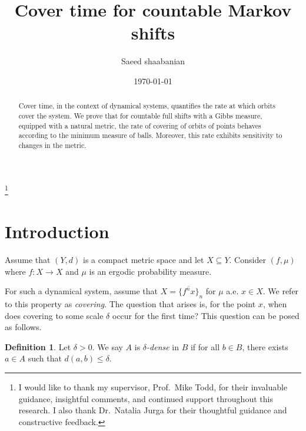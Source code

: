 \documentclass[11pt, reqno]{amsart}
\theoremstyle{plain}%
\theoremstyle{definition}
\newtheorem{definition}[theorem]{Definition}
\theoremstyle{definition}
\numberwithin{equation}{section}
\begin{document}
\author[S.~Shaabanian]{Saeed shaabanian}
\thanks{I would like to thank my supervisor, Prof.\ Mike Todd, for their invaluable guidance, insightful comments, and continued support throughout this research.
I also thank Dr.\ Natalia Jurga for their thoughtful guidance and constructive feedback.}
\address{Mathematical Institute\\
University of St Andrews\\
North Haugh\\
St Andrews\\
KY16 9SS\\
Scotland} 


\title{ Cover time for countable Markov shifts}
\date{\today}
\maketitle


\begin{abstract}
Cover time, in the context of dynamical systems, quantifies the rate at which orbits cover the system. We prove that for countable full shifts with a Gibbs measure, equipped with a natural metric, the rate of covering of orbits of points behaves according to the minimum measure of balls. Moreover, this rate exhibits sensitivity to changes in the metric.
\end{abstract}

\section{Introduction}\label{Sec:Int}

Assume that $(Y,d)$ is a compact metric space and let $X\subseteq Y$. Consider $(f,\mu)$ where $f:X\to X$ and $\mu$ is an ergodic probability measure.

For such a dynamical system, assume that $X=\overline{\{f^nx\}}_n$ for $\mu$ a.e. $x\in X$. We refer to this property as \emph{covering}. The question that arises is, for the point $x$, when does covering to some scale $\delta$ occur for the first time?
This question can be posed as follows.

\begin{definition}
    Let $\delta>0$. We say $A$ is \textit{$\delta$-dense} in $B$ if for all $ b\in B$, there exists $ a\in A$ such that $ d(a,b)\le \delta.$
\end{definition}
\end{document}
